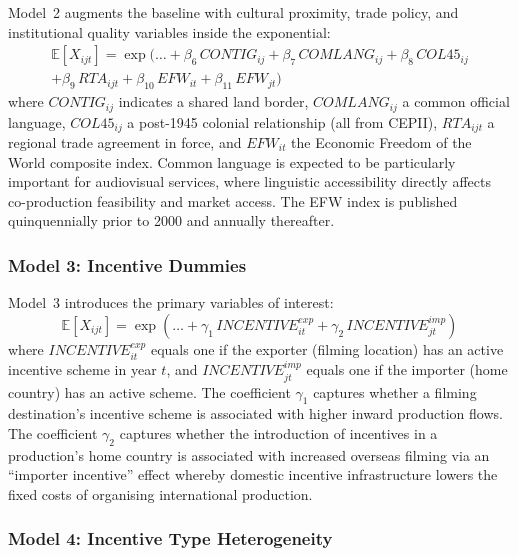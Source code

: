 Model~2 augments the baseline with cultural proximity, trade policy, and institutional quality variables inside the exponential:
\begin{multline}
\mathbb{E}[X_{ijt}] = \exp\big(\ldots + \beta_6\, CONTIG_{ij} + \beta_7\, COMLANG_{ij} + \beta_8\, COL45_{ij} \\
+ \beta_9\, RTA_{ijt} + \beta_{10}\, EFW_{it} + \beta_{11}\, EFW_{jt}\big)
\label{eq:model2}
\end{multline}
where $CONTIG_{ij}$ indicates a shared land border, $COMLANG_{ij}$ a common official language, $COL45_{ij}$ a post-1945 colonial relationship (all from CEPII), $RTA_{ijt}$ a regional trade agreement in force, and $EFW_{it}$ the Economic Freedom of the World composite index. Common language is expected to be particularly important for audiovisual services, where linguistic accessibility directly affects co-production feasibility and market access. The EFW index is published quinquennially prior to 2000 and annually thereafter.

\subsubsection{Model 3: Incentive Dummies}

Model~3 introduces the primary variables of interest:
\begin{equation}
\mathbb{E}[X_{ijt}] = \exp\left(\ldots + \gamma_1\, INCENTIVE_{it}^{exp} + \gamma_2\, INCENTIVE_{jt}^{imp}\right)
\label{eq:model3}
\end{equation}
where $INCENTIVE_{it}^{exp}$ equals one if the exporter (filming location) has an active incentive scheme in year $t$, and $INCENTIVE_{jt}^{imp}$ equals one if the importer (home country) has an active scheme. The coefficient $\gamma_1$ captures whether a filming destination's incentive scheme is associated with higher inward production flows. The coefficient $\gamma_2$ captures whether the introduction of incentives in a production's home country is associated with increased overseas filming via an ``importer incentive'' effect whereby domestic incentive infrastructure lowers the fixed costs of organising international production.

\subsubsection{Model 4: Incentive Type Heterogeneity}

